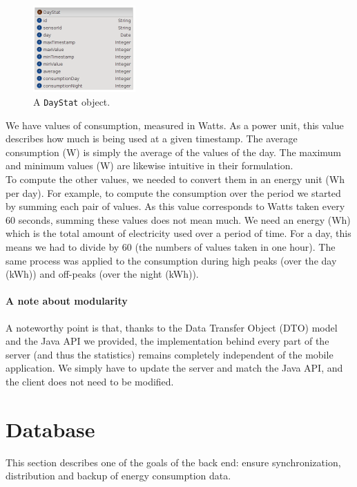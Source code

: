\documentclass[a4paper, oneside, 11pt]{book}
\begin{document}
\begin{figure}[htbp]
	\centerline{\includegraphics[width=0.35\textwidth]{daystat.png}}
	\caption{A \texttt{DayStat} object.}
	\label{fig:daystat}
\end{figure}

We have values of consumption, measured in Watts. As a power unit, this value describes how much is being used at a given timestamp. The average consumption (W) is simply the average of the values of the day. The maximum and minimum values (W) are likewise intuitive in their formulation. \\

To compute the other values, we needed to convert them in an energy unit (Wh per day). For example, to compute the consumption over the period we started by summing each pair of values. As this value corresponds to Watts taken every 60 seconds, summing these values does not mean much. We need an energy (Wh) which is the total amount of electricity used over a period of time. For a day, this means we had to divide by 60 (the numbers of values taken in one hour). The same process was applied to the consumption during high peaks (over the day (kWh)) and off-peaks (over the night (kWh)).

\paragraph{A note about modularity}
A noteworthy point is that, thanks to the Data Transfer Object (DTO) model and the Java API we provided, the implementation behind every part of the server (and thus the statistics) remains completely independent of the mobile application. We simply have to update the server and match the Java API, and the client does not need to be modified.

\section{Database}
This section describes one of the goals of the back end: ensure synchronization, distribution and backup of energy consumption data.\\
\end{document}
